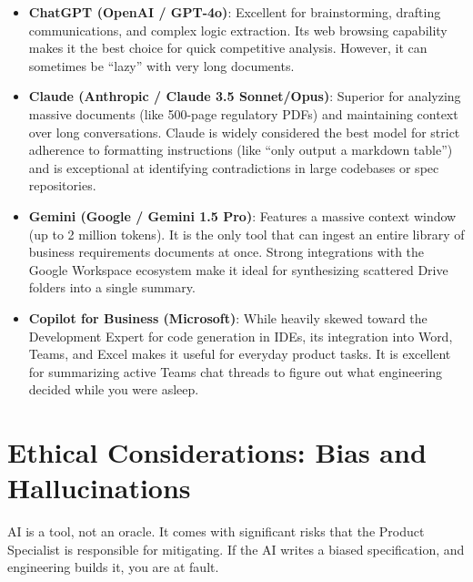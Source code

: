 \documentclass[
  11pt,
  openany,
  oneside]{book}
\providecommand{\tightlist}{%
  \setlength{\itemsep}{0pt}\setlength{\parskip}{0pt}}
\begin{document}
\begin{itemize}
\tightlist
\item
  \textbf{ChatGPT (OpenAI / GPT-4o)}: Excellent for brainstorming,
  drafting communications, and complex logic extraction. Its web
  browsing capability makes it the best choice for quick competitive
  analysis. However, it can sometimes be ``lazy'' with very long
  documents.
\item
  \textbf{Claude (Anthropic / Claude 3.5 Sonnet/Opus)}: Superior for
  analyzing massive documents (like 500-page regulatory PDFs) and
  maintaining context over long conversations. Claude is widely
  considered the best model for strict adherence to formatting
  instructions (like ``only output a markdown table'') and is
  exceptional at identifying contradictions in large codebases or spec
  repositories.
\item
  \textbf{Gemini (Google / Gemini 1.5 Pro)}: Features a massive context
  window (up to 2 million tokens). It is the only tool that can ingest
  an entire library of business requirements documents at once. Strong
  integrations with the Google Workspace ecosystem make it ideal for
  synthesizing scattered Drive folders into a single summary.
\item
  \textbf{Copilot for Business (Microsoft)}: While heavily skewed toward
  the Development Expert for code generation in IDEs, its integration
  into Word, Teams, and Excel makes it useful for everyday product
  tasks. It is excellent for summarizing active Teams chat threads to
  figure out what engineering decided while you were asleep.
\end{itemize}

\section{Ethical Considerations: Bias and
Hallucinations}\label{ethical-considerations-bias-and-hallucinations}

AI is a tool, not an oracle. It comes with significant risks that the
Product Specialist is responsible for mitigating. If the AI writes a
biased specification, and engineering builds it, you are at fault.
\end{document}
